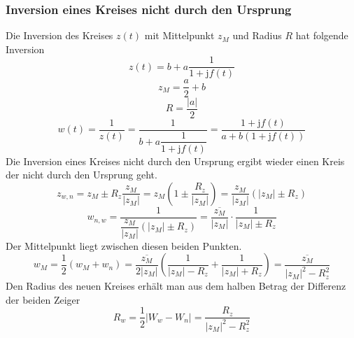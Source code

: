 \subsubsection{Inversion eines Kreises nicht durch den Ursprung}
Die Inversion des Kreises $z\left(t\right)$ mit Mittelpunkt $z_M$ und Radius $R$ hat folgende Inversion
\begin{equation}
\boxed{z\left(t\right)=b+a\dfrac{1}{1+\text{j}f\left(t\right)}}
\end{equation}
\begin{equation}
\boxed{z_M=\dfrac{a}{2}+b}
\end{equation}
\begin{equation}
\boxed{R=\dfrac{\Big\vert a\Big\vert}{2}}
\end{equation}
\begin{equation}
\boxed{w\left(t\right)=\dfrac{1}{z\left(t\right)}=\dfrac{1}{b+a\dfrac{1}{1+\text{j}f\left(t\right)}}=\dfrac{1+\text{j}f\left(t\right)}{a+b\left(1+\text{j}f\left(t\right)\right)}}
\end{equation}
Die Inversion eines Kreises nicht durch den Ursprung ergibt wieder einen Kreis der nicht durch den Ursprung geht.
\begin{equation}
\boxed{z_{w,n}=z_M\pm R_z\dfrac{z_M}{\Big\vert z_M\Big\vert}=z_M\left(1\pm \dfrac{R_z}{\Big\vert z_M\Big\vert}\right)=\dfrac{z_M}{\Big\vert z_M\Big\vert}\left(\Big\vert z_M\Big\vert\pm R_z\right)}
\end{equation}
\begin{equation}
\boxed{w_{n,w}=\dfrac{1}{\dfrac{z_M}{\Big\vert z_M\Big\vert}\left(\Big\vert z_M\Big\vert\pm R_z\right)}=\dfrac{\overline{z_M}}{\Big\vert z_M\Big\vert}\cdot \dfrac{1}{\Big\vert z_M\Big\vert\pm R_z}}
\end{equation}
Der Mittelpunkt liegt zwischen diesen beiden Punkten.
\begin{equation}
\boxed{w_M=\dfrac{1}{2}\left(w_M+w_n\right)=\dfrac{\overline{z_M}}{2\Big\vert z_M\Big\vert}\left(\dfrac{1}{\Big\vert z_M\Big\vert-R_z}+\dfrac{1}{\Big\vert z_M\Big\vert+R_z}\right)=\dfrac{\overline{z_M}}{\Big\vert z_M\Big\vert^2-R_z^2}}
\end{equation}
Den Radius des neuen Kreises erhält man aus dem halben Betrag der Differenz der beiden Zeiger
\begin{equation}
\boxed{R_w=\dfrac{1}{2}\Big\vert W_w-W_n\Big\vert=\dfrac{R_z}{\Big\vert z_M\Big\vert^2-R_z^2}}
\end{equation}
